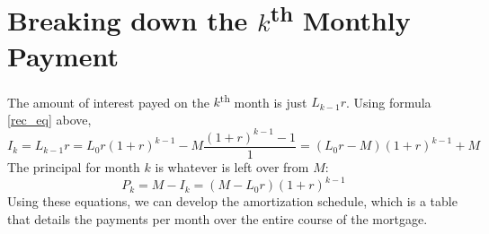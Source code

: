 \documentclass[12pt]{article}
\newcommand{\ts}{\textsuperscript}
\begin{document}
\section*{Breaking down the $k$\ts{th} Monthly Payment}
The amount of interest payed on the $k$\ts{th} month is just $L_{k-1}r$. Using formula \ref{rec_eq} above, 
$$I_k = L_{k-1}r = L_0 r(1+r)^{k-1} - M\frac{(1+r)^{k-1} - 1}{1} = (L_0 r - M)(1+r)^{k-1} + M$$
The principal for month $k$ is whatever is left over from $M$:
$$P_k = M - I_k = (M - L_0 r)(1+r)^{k-1}$$
Using these equations, we can develop the amortization schedule, which is a table that details the payments per month over the entire course of the mortgage. 
\end{document}
